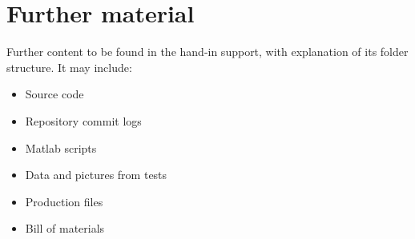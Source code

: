 \section{Further material}

Further content to be found in the hand-in support, with explanation of its folder structure.
It may include:

\begin{itemize}
\item Source code
\item Repository commit logs
\item Matlab scripts
\item Data and pictures from tests
\item Production files
\item Bill of materials
\end{itemize}